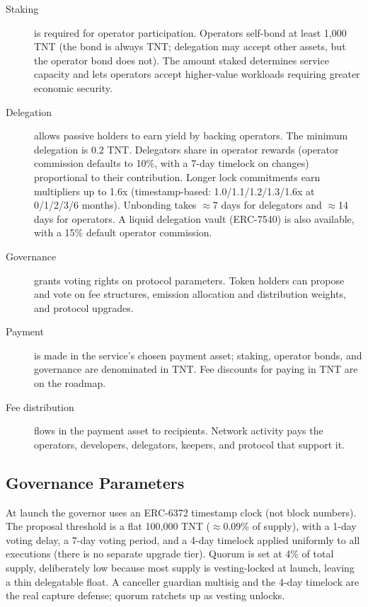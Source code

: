\documentclass[11pt,a4paper]{article}
\begin{document}
\begin{description}
    \item[Staking] is required for operator participation. Operators self-bond at least 1,000 TNT (the bond is always TNT; delegation may accept other assets, but the operator bond does not). The amount staked determines service capacity and lets operators accept higher-value workloads requiring greater economic security.
    \item[Delegation] allows passive holders to earn yield by backing operators. The minimum delegation is 0.2 TNT. Delegators share in operator rewards (operator commission defaults to 10\%, with a 7-day timelock on changes) proportional to their contribution. Longer lock commitments earn multipliers up to 1.6x (timestamp-based: 1.0/1.1/1.2/1.3/1.6x at 0/1/2/3/6 months). Unbonding takes $\approx$7 days for delegators and $\approx$14 days for operators. A liquid delegation vault (ERC-7540) is also available, with a 15\% default operator commission.
    \item[Governance] grants voting rights on protocol parameters. Token holders can propose and vote on fee structures, emission allocation and distribution weights, and protocol upgrades.
    \item[Payment] is made in the service's chosen payment asset; staking, operator bonds, and governance are denominated in TNT. Fee discounts for paying in TNT are on the roadmap.
    \item[Fee distribution] flows in the payment asset to recipients. Network activity pays the operators, developers, delegators, keepers, and protocol that support it.
\end{description}

\subsection{Governance Parameters}

At launch the governor uses an ERC-6372 timestamp clock (not block numbers). The proposal threshold is a flat 100,000 TNT ($\approx$0.09\% of supply), with a 1-day voting delay, a 7-day voting period, and a 4-day timelock applied uniformly to all executions (there is no separate upgrade tier). Quorum is set at 4\% of total supply, deliberately low because most supply is vesting-locked at launch, leaving a thin delegatable float. A canceller guardian multisig and the 4-day timelock are the real capture defense; quorum ratchets up as vesting unlocks.
\end{document}
